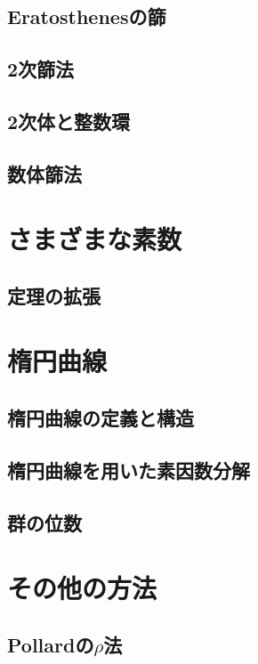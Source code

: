 \subsection{Eratosthenesの篩}

\subsection{2次篩法}

\subsection{2次体と整数環}

\subsection{数体篩法}


\section{さまざまな素数}
\subsection{定理の拡張}


\section{楕円曲線}
\subsection{楕円曲線の定義と構造}

\subsection{楕円曲線を用いた素因数分解}

\subsection{群の位数}


\section{その他の方法}
\subsection{Pollardの$\rho$法}

